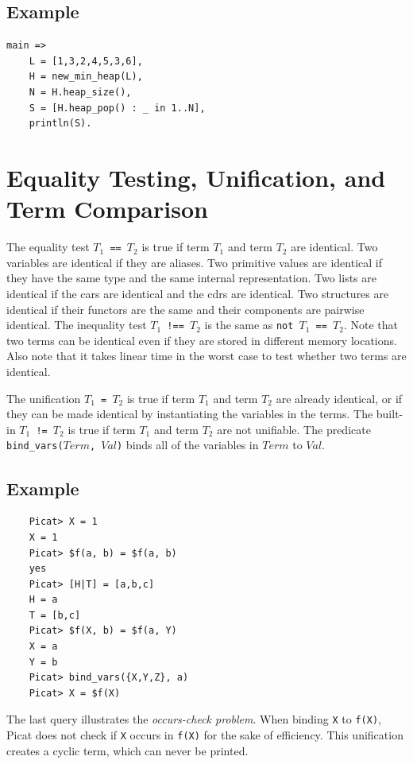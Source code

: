 \subsection*{Example}
\begin{verbatim}
main =>
    L = [1,3,2,4,5,3,6],
    H = new_min_heap(L),
    N = H.heap_size(),
    S = [H.heap_pop() : _ in 1..N],
    println(S).
\end{verbatim}

\section{\label{sec:unification}Equality Testing, Unification, and Term Comparison}
The equality test \texttt{$T_1$ == $T_2$}  is true if term $T_1$ and term $T_2$ are identical. Two variables are identical if they are aliases. Two primitive values are identical if they have the same type and the same internal representation. Two lists are identical if the cars are identical and the cdrs are identical. Two structures are identical if their functors are the same and their components are pairwise identical. The inequality test \texttt{$T_1$ !== $T_2$}  is the same as \texttt{not $T_1$ == $T_2$}.  Note that two terms can be identical even if they are stored in different memory locations.  Also note that it takes linear time in the worst case to test whether two terms are identical.

The unification \texttt{$T_1$ = $T_2$}  is true if term $T_1$ and term $T_2$ are already identical, or if they can be made identical by instantiating the variables in the terms. The built-in \texttt{$T_1$ != $T_2$}  is true if term $T_1$ and term $T_2$ are not unifiable. The predicate \texttt{bind\_vars($Term$, $Val$)} binds all of the variables in $Term$ to $Val$.

\subsection*{Example}
\begin{verbatim}
    Picat> X = 1
    X = 1
    Picat> $f(a, b) = $f(a, b)
    yes
    Picat> [H|T] = [a,b,c]
    H = a
    T = [b,c]
    Picat> $f(X, b) = $f(a, Y)
    X = a
    Y = b
    Picat> bind_vars({X,Y,Z}, a)
    Picat> X = $f(X)
\end{verbatim}
The last query illustrates the \emph{occurs-check problem}. When binding \texttt{X} to \texttt{f(X)}, Picat does not check if \texttt{X} occurs in \texttt{f(X)} for the sake of efficiency. This unification creates a cyclic term, which can never be printed.

